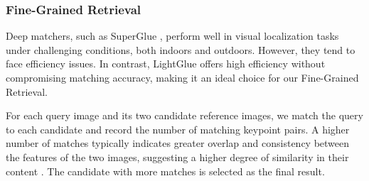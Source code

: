 \subsubsection{Fine-Grained Retrieval}

Deep matchers, such as SuperGlue \cite{sarlin2020supergluelearningfeaturematching}, perform well in visual localization tasks under challenging conditions, both indoors and outdoors. However, they tend to face efficiency issues. In contrast, LightGlue \cite{lindenberger2023lightgluelocalfeaturematching} offers high efficiency without compromising matching accuracy, making it an ideal choice for our Fine-Grained Retrieval.

For each query image and its two candidate reference images, we match the query to each candidate and record the number of matching keypoint pairs. A higher number of matches typically indicates greater overlap and consistency between the features of the two images, suggesting a higher degree of similarity in their content \cite{Lowe2004DistinctiveIF}. The candidate with more matches is selected as the final result.
